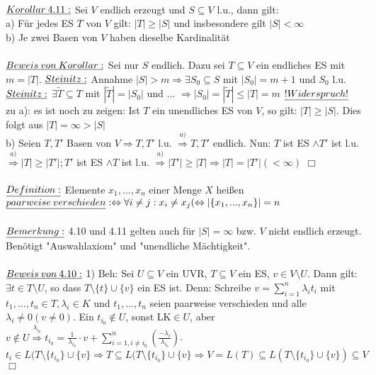 \documentclass[fleqn, a4paper, 11pt]{article}
\begin{document}
\\
$\uline{Korollar\:4.11:}$ Sei $V$ endlich erzeugt und $S\subseteq V$ l.u., dann gilt:\\
a) F\"ur jedes ES $T$ von $V$ gilt: $|T|\geq |S|$ und insbesondere gilt $|S| < \infty$\\
b) Je zwei Basen von $V$ haben dieselbe Kardinalit\"at\\ 
\\
$\uline{Beweis\:von\:Korollar:}$ Sei nur $S$ endlich. Dazu sei $T\subseteq V$ ein endliches ES mit $m=|T|$. $\uline{Steinitz:}$ Annahme $|S| > m \Rightarrow \exists S_0\subseteq S$ mit $|S_0|=m+1$ und $S_0$ l.u.\\
$\uline{Steinitz:}$ $\exists\tilde{T}\subseteq T$ mit $|\tilde{T}|=|S_0|$ und ... $\Rightarrow|S_0|=|\tilde{T}|\leq|T|=m$ $\uline{!Widerspruch!}$\\
zu a): es ist noch zu zeigen: Ist $T$ ein unendliches ES von $V$, so gilt: $|T|\geq|S|$. Dies folgt aus $|T|=\infty > |S|$\\
b) Seien $T,T'$ Basen von $V\Rightarrow T,T'$ l.u. $\stackrel{a)}{\Rightarrow} T,T'$ endlich. Nun: $T$ ist ES $\wedge T'$ ist l.u. $\stackrel{a)}{\Rightarrow} |T|\geq|T'|;T'$ ist ES $\wedge T$ ist l.u. $\stackrel{a)}{\Rightarrow} |T'|\geq |T| \Rightarrow |T|=|T'| (< \infty)$ \hfill $\Box$\\
\\
$\uline{Definition:}$ Elemente $x_1,...,x_n$ einer Menge $X$ hei\ss{}en $\uline{paarweise\:verschieden}:\Leftrightarrow \forall i\neq j:x_i\neq x_j(\Leftrightarrow |\{x_1,...,x_n\}|=n$\\
\\
$\uline{Bemerkung:}$ 4.10 und 4.11 gelten auch f\"ur $|S|=\infty$ bzw. $V$ nicht endlich erzeugt. Ben\"otigt "Auswahlaxiom" und "unendliche M\"achtigkeit".\\
\\
$\uline{Beweis\:von\:4.10:}$ 1) Beh: Sei $U\subseteq V$ ein UVR, $T\subseteq V$ ein ES, $v\in V\setminus U$. Dann gilt: $\exists t\in T\setminus U$, so dass $T\setminus\{t\}\cup\{v\}$ ein ES ist. Denn: Schreibe $v=\sum\limits_{i=1}^n \lambda_i t_i$ mit $t_1,...,t_n \in T,\lambda_i\in K$ und $t_1,...,t_n$ seien paarweise verschieden und alle $\lambda_i\neq 0(v\neq 0)$. Ein $t_{i_0}\notin U$, sonst LK$\in U$, aber $v\notin U \stackrel{\lambda_{i_0}}{\Rightarrow} t_{i_0}=\tfrac{1}{\lambda_{i_0}}\cdot v +\sum\limits_{i=1,i\neq i_0}^n (\tfrac{-\lambda_i}{\lambda_{i_0}})$. $t_i\in L(T\setminus\{t_{i_0}\}\cup\{v\}\Rightarrow T\subseteq L(T\setminus\{t_{i_0}\}\cup\{v\}\Rightarrow V=L(T)\subseteq L(T\setminus\{t_{i_0}\}\cup\{v\})\subseteq V$ \hfill $\Box$\\
\end{document}
